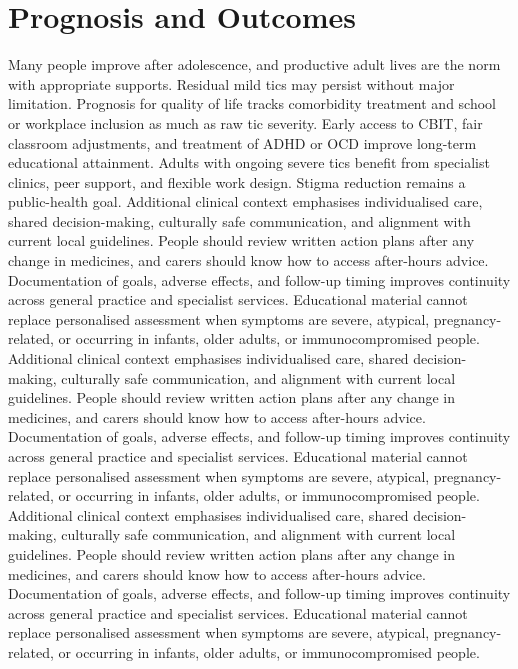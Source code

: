 \section*{Prognosis and Outcomes}
Many people improve after adolescence, and productive adult lives are the norm with appropriate supports. Residual mild tics may persist without major limitation. Prognosis for quality of life tracks comorbidity treatment and school or workplace inclusion as much as raw tic severity. Early access to CBIT, fair classroom adjustments, and treatment of ADHD or OCD improve long-term educational attainment. Adults with ongoing severe tics benefit from specialist clinics, peer support, and flexible work design. Stigma reduction remains a public-health goal. Additional clinical context emphasises individualised care, shared decision-making, culturally safe communication, and alignment with current local guidelines. People should review written action plans after any change in medicines, and carers should know how to access after-hours advice. Documentation of goals, adverse effects, and follow-up timing improves continuity across general practice and specialist services. Educational material cannot replace personalised assessment when symptoms are severe, atypical, pregnancy-related, or occurring in infants, older adults, or immunocompromised people. Additional clinical context emphasises individualised care, shared decision-making, culturally safe communication, and alignment with current local guidelines. People should review written action plans after any change in medicines, and carers should know how to access after-hours advice. Documentation of goals, adverse effects, and follow-up timing improves continuity across general practice and specialist services. Educational material cannot replace personalised assessment when symptoms are severe, atypical, pregnancy-related, or occurring in infants, older adults, or immunocompromised people. Additional clinical context emphasises individualised care, shared decision-making, culturally safe communication, and alignment with current local guidelines. People should review written action plans after any change in medicines, and carers should know how to access after-hours advice. Documentation of goals, adverse effects, and follow-up timing improves continuity across general practice and specialist services. Educational material cannot replace personalised assessment when symptoms are severe, atypical, pregnancy-related, or occurring in infants, older adults, or immunocompromised people.

